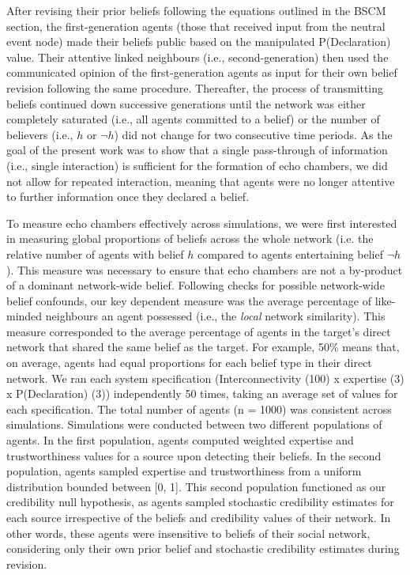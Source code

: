\documentclass[doc,floatsintext]{apa6}
\begin{document}
After revising their prior beliefs following the equations outlined in the BSCM section, the first-generation agents (those that received input from the neutral event node) made their beliefs public based on the manipulated P(Declaration) value. Their attentive linked neighbours (i.e., second-generation) then used the communicated opinion of the first-generation agents as input for their own belief revision following the same procedure. Thereafter, the process of transmitting beliefs continued down successive generations until the network was either completely saturated (i.e., all agents committed to a belief) or the number of believers (i.e., \(h\) or \(\neg h\)) did not change for two consecutive time periods. As the goal of the present work was to show that a single pass-through of information (i.e., single interaction) is sufficient for the formation of echo chambers, we did not allow for repeated interaction, meaning that agents were no longer attentive to further information once they declared a belief.

To measure echo chambers effectively across simulations, we were first interested in measuring global proportions of beliefs across the whole network (i.e. the relative number of agents with belief \(h\) compared to agents entertaining belief \(\neg h\)). This measure was necessary to ensure that echo chambers are not a by-product of a dominant network-wide belief. Following checks for possible network-wide belief confounds, our key dependent measure was the average percentage of like-minded neighbours an agent possessed (i.e., the \textit{local} network similarity). This measure corresponded to the average percentage of agents in the target's direct network that shared the same belief as the target. For example, 50\% means that, on average, agents had equal proportions for each belief type in their direct network. We ran each system specification (Interconnectivity (100) x expertise (3) x P(Declaration) (3)) independently 50 times, taking an average set of values for each specification. The total number of agents (n = 1000) was consistent across simulations. Simulations were conducted between two different populations of agents. In the first population, agents computed weighted expertise and trustworthiness values for a source upon detecting their beliefs. In the second population, agents sampled expertise and trustworthiness from a uniform distribution bounded between [0, 1]. This second population functioned as our credibility null hypothesis, as agents sampled stochastic credibility estimates for each source irrespective of the beliefs and credibility values of their network. In other words, these agents were insensitive to beliefs of their social network, considering only their own prior belief and stochastic credibility estimates during revision. 
\end{document}
